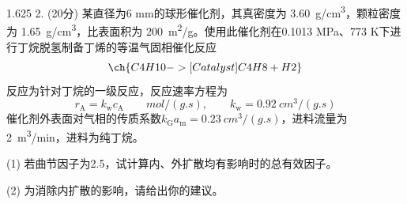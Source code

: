\documentclass[12pt, b5paper]{article}
\begin{document}
\begin{spacing}{1.625}
\vspace{4em}
2. (20分) 某直径为6 mm的球形催化剂，其真密度为 \SI{3.60}{g/cm^3}，颗粒密度为 \SI{1.65}{g/cm^3}，比表面积为 \SI{200}{m^2/g}。使用此催化剂在0.1013 MPa、773 K下进行丁烷脱氢制备丁烯的等温气固相催化反应
\[
    \ch{C4H10 ->[Catalyst] C4H8 + H2}
\]
反应为针对丁烷的一级反应，反应速率方程为
\[
    r_\mathrm{A} = k_\mathrm{w} c_\mathrm{A} \qquad \si{mol/(g.s)}, \qquad k_\mathrm{w} = \SI{0.92}{cm^3/(g.s)}
\]
催化剂外表面对气相的传质系数$k_{\mathrm{G}} a_{\mathrm{m}} = \SI{0.23}{cm^3/(g.s)}$，进料流量为\SI{2}{m^3/min}，进料为纯丁烷。

(1) 若曲节因子为2.5，试计算内、外扩散均有影响时的总有效因子。

(2) 为消除内扩散的影响，请给出你的建议。


\end{spacing}
\end{document}
